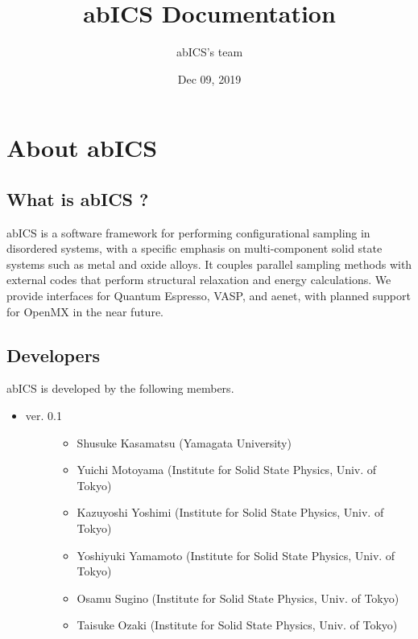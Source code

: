 \documentclass[letterpaper,10pt,english]{sphinxmanual}
\title{abICS Documentation}
\date{Dec 09, 2019}
\author{abICS's team}
\begin{document}
\maketitle
\sphinxtableofcontents
{}\label{\detokenize{index::doc}}



\chapter{About abICS}
\label{\detokenize{about/index::doc}}\label{\detokenize{about/index:welcome-to-abics-s-documentation}}\label{\detokenize{about/index:about-abics}}

\section{What is abICS ?}
\label{\detokenize{about/info:what-is-abics}}\label{\detokenize{about/info::doc}}
abICS is a software framework for performing configurational sampling in disordered systems, with a specific emphasis on multi-component solid state systems such as metal and oxide alloys. It couples parallel sampling methods with external codes that perform structural relaxation and energy calculations. We provide interfaces for Quantum Espresso, VASP, and aenet, with planned support for OpenMX in the near future.


\section{Developers}
\label{\detokenize{about/info:developers}}
abICS is developed by the following members.
\begin{itemize}
\item {} \begin{description}
\item[{ver. 0.1}] \leavevmode\begin{itemize}
\item {} 
Shusuke Kasamatsu (Yamagata University)

\item {} 
Yuichi Motoyama (Institute for Solid State Physics, Univ. of Tokyo)

\item {} 
Kazuyoshi Yoshimi (Institute for Solid State Physics, Univ. of Tokyo)

\item {} 
Yoshiyuki Yamamoto (Institute for Solid State Physics, Univ. of Tokyo)

\item {} 
Osamu Sugino (Institute for Solid State Physics, Univ. of Tokyo)

\item {} 
Taisuke Ozaki (Institute for Solid State Physics, Univ. of Tokyo)

\end{itemize}

\end{description}

\end{itemize}
\end{document}
